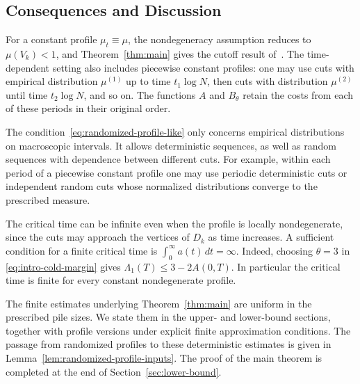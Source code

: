 \subsection{Consequences and Discussion}

For a constant profile $\mu_t\equiv\mu$, the nondegeneracy assumption
reduces to $\mu(V_k)<1$, and Theorem~\ref{thm:main} gives the cutoff
result of~\cite{SSW}. The time-dependent setting also includes
piecewise constant profiles: one may use cuts with empirical
distribution $\mu^{(1)}$ up to time $t_1\log N$, then cuts with
distribution $\mu^{(2)}$ until time $t_2\log N$, and so on. The
functions $A$ and $B_\theta$ retain the costs from each of these
periods in their original order.

The condition~\eqref{eq:randomized-profile-like} only concerns empirical
distributions on macroscopic intervals. It allows deterministic sequences,
as well as random sequences with dependence between different cuts.
For example, within each period of a piecewise constant profile one may
use periodic deterministic cuts or independent random cuts whose
normalized distributions converge to the prescribed measure.

The critical time can be infinite even when the profile is locally
nondegenerate, since the cuts may approach the vertices of $D_k$ as time
increases. A sufficient condition for a finite critical time is
$\int_0^\infty a(t)\,dt=\infty$. Indeed, choosing $\theta=3$ in
\eqref{eq:intro-cold-margin} gives
$\Lambda_1(T)\le3-2A(0,T)$. In particular the critical time is finite
for every constant nondegenerate profile.

The finite estimates underlying Theorem~\ref{thm:main} are uniform in
the prescribed pile sizes. We state them in the upper- and lower-bound
sections, together with profile versions under explicit finite
approximation conditions. The passage from randomized profiles to
these deterministic estimates is given in
Lemma~\ref{lem:randomized-profile-inputs}. The proof of the main theorem
is completed at the end of Section~\ref{sec:lower-bound}.

